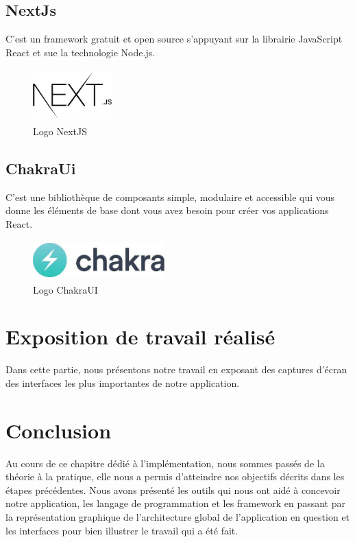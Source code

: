 \documentclass[12pt]{report}
\begin{document}
\subsection{NextJs}
\vspace{0.1in}
\hspace*{0.16in}
C’est un framework gratuit et open source s’appuyant sur la librairie JavaScript React et sue la technologie Node.js.

\newpage

\begin{figure}[h]
\centering
    \includegraphics[width = 1.2in, height = 0.8in]{../images/NextJS.png}
\caption{Logo NextJS}
\end{figure}

\subsection{ChakraUi}
\vspace{0.1in}
\hspace*{0.16in}
C’est une bibliothèque de composants simple, modulaire et accessible qui vous donne les éléments de base dont vous avez besoin pour créer vos applications React.

\vspace{0.1in}

\begin{figure}[h]
\centering
    \includegraphics[width = 2in, height = 0.6in]{../images/chakraUI.jpg}
\caption{Logo ChakraUI}
\end{figure}

\section{Exposition de travail réalisé}
\vspace{0.1in}
\hspace*{0.16in}
Dans cette partie, nous présentons notre travail en exposant des captures d’écran des interfaces les plus importantes de notre application.

\section{Conclusion}
\vspace{0.1in}
\hspace*{0.16in}
Au cours de ce chapitre dédié à l’implémentation, nous sommes passés de la théorie à la pratique, elle nous a permis d’atteindre nos objectifs décrits dans les étapes précédentes. Nous avons présenté les outils qui nous ont aidé à concevoir notre application, les langage de programmation et les framework en passant par la représentation graphique de l’architecture global de l’application en question et les interfaces pour bien illustrer le travail qui a été fait.
\end{document}
